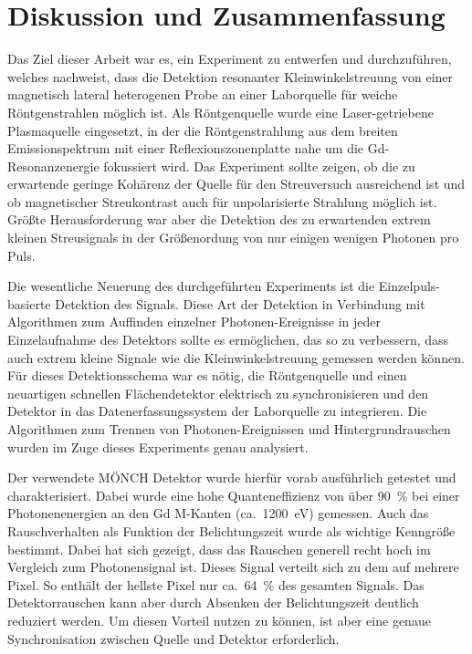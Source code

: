 \chapter{Diskussion und Zusammenfassung}
Das Ziel dieser Arbeit war es, ein Experiment zu entwerfen und durchzuführen, welches nachweist, dass die Detektion resonanter Kleinwinkelstreuung von einer magnetisch lateral heterogenen Probe an einer Laborquelle für weiche Röntgenstrahlen möglich ist. Als Röntgenquelle wurde eine Laser-getriebene Plasmaquelle eingesetzt, in der die Röntgenstrahlung aus dem breiten Emissionspektrum mit einer Reflexionszonenplatte nahe um die Gd-Resonanzenergie fokussiert wird. Das Experiment sollte zeigen, ob die zu erwartende geringe Kohärenz der Quelle für den Streuversuch ausreichend ist und ob magnetischer Streukontrast auch für unpolarisierte Strahlung möglich ist. Größte Herausforderung war aber die Detektion des zu erwartenden extrem kleinen Streusignals in der Größenordung von nur einigen wenigen Photonen pro Puls.

\noindent
Die wesentliche Neuerung des durchgeführten Experiments ist die Einzelpuls-basierte Detektion des Signals. Diese Art der Detektion in Verbindung mit Algorithmen zum Auffinden einzelner Photonen-Ereignisse in jeder Einzelaufnahme des Detektors sollte es ermöglichen, das  so zu verbessern, dass auch extrem kleine Signale wie die Kleinwinkelstreuung gemessen werden können. Für dieses Detektionsschema war es nötig, die Röntgenquelle und einen neuartigen schnellen Flächendetektor elektrisch zu synchronisieren und den Detektor in das Datenerfassungssystem der Laborquelle zu integrieren. Die Algorithmen zum Trennen von Photonen-Ereignissen und Hintergrundrauschen wurden im Zuge dieses Experiments genau analysiert.

\noindent
Der verwendete MÖNCH Detektor wurde hierfür vorab ausführlich getestet und charakterisiert. Dabei wurde eine hohe Quanteneffizienz von über \SI{90}{\percent} bei einer Photonenenergien an den Gd M-Kanten (ca.\ \SI{1200}{\eV}) gemessen. Auch das Rauschverhalten als Funktion der Belichtungszeit wurde als wichtige Kenngröße bestimmt. Dabei hat sich gezeigt, dass das Rauschen generell recht hoch im Vergleich zum Photonensignal ist. Dieses Signal verteilt sich zu dem auf mehrere Pixel. So enthält der hellste Pixel nur ca.\ \SI{64}{\percent} des gesamten Signals. Das Detektorrauschen kann aber durch Absenken der Belichtungszeit deutlich reduziert werden. Um diesen Vorteil nutzen zu können, ist aber eine genaue Synchronisation zwischen Quelle und Detektor erforderlich.

